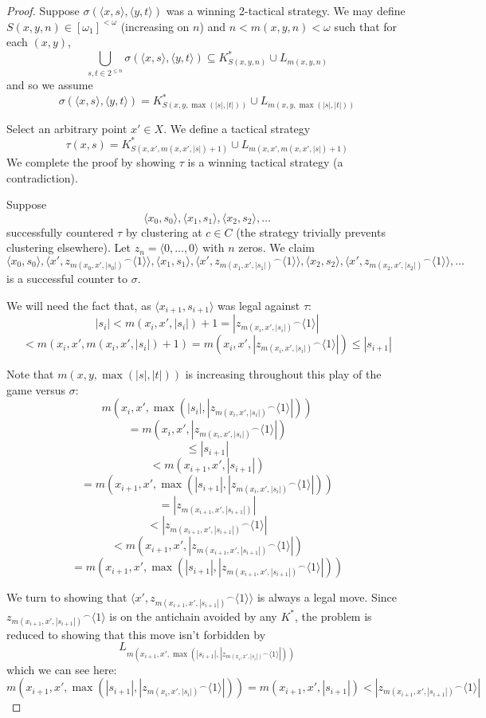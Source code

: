 \documentclass[11pt]{article}
\theoremstyle{plain}
\theoremstyle{definition}
\theoremstyle{remark}
\newcommand{\<}{\langle}
\renewcommand{\>}{\rangle}
\begin{document}
\begin{proof}
Suppose $\sigma(\<x,s\>,\<y,t\>)$ was a winning 2-tactical strategy. We may define $S(x,y,n)\in [\omega_1]^{<\omega}$ (increasing on $n$) and $n<m(x,y,n)<\omega$ such that for each $(x,y)$,
  \[
    \bigcup_{s,t \in 2^{\leq n}} \sigma(\<x,s\>,\<y,t\>) \subseteq 
    K^*_{S(x,y,n)} \cup L_{m(x,y,n)}
  \]
and so we assume
  \[
    \sigma(\<x,s\>,\<y,t\>) =
    K^*_{S(x,y,\max(|s|,|t|))} \cup L_{m(x,y,\max(|s|,|t|))}
  \]

Select an arbitrary point $x' \in X$. We define a tactical strategy 
  \[
  \tau(x,s) = 
  K^*_{S(x,x',m(x,x',|s|)+1)} \cup L_{m(x,x',m(x,x',|s|)+1)}
  \]
We complete the proof by showing $\tau$ is a winning tactical strategy (a contradiction).

Suppose
\[
\<x_0, s_0\>, \<x_1, s_1\>, \<x_2, s_2\>, \dots
\]
successfully countered $\tau$ by clustering at $c\in C$ (the strategy trivially prevents clustering elsewhere). Let $z_n = \<0,\dots,0\>$ with $n$ zeros. We claim
\[
\<x_0, s_0\>, \<x', {z_{m(x_0,x',|s_0|)}}^\frown\<1\>\>, \<x_1, s_1\>, \<x', {z_{m(x_1,x',|s_1|)}}^\frown\<1\>\>,  \<x_2, s_2\>, \<x', {z_{m(x_2,x',|s_2|)}}^\frown\<1\>\>, \dots
\]
is a successful counter to $\sigma$.

We will need the fact that, as $\<x_{i+1},s_{i+1}\>$ was legal against $\tau$:
  \[
    |s_i| <
    m(x_i,x',|s_i|)+1 =
    |{z_{m(x_i,x',|s_i|)}}^\frown\<1\>| 
  \]
  \[
    <
    m(x_i,x',m(x_i,x',|s_i|)+1) =
    m(x_i,x',|{z_{m(x_i,x',|s_i|)}}^\frown\<1\>|) \leq
    |s_{i+1}|
  \]

Note that $m(x,y,\max(|s|,|t|))$ is increasing throughout this play of the game versus $\sigma$:
  \[
    m(x_i,x',\max(|s_i|,|{z_{m(x_i,x',|s_i|)}}^\frown\<1\>|))
  \]
  \[
    =
    m(x_i,x',|{z_{m(x_i,x',|s_i|)}}^\frown\<1\>|)
  \]
  \[
    \leq
    |s_{i+1}| 
  \]
  \[
    <
    m(x_{i+1},x',|s_{i+1}|)
  \]
  \[
    =
    m(x_{i+1},x',\max(|s_{i+1}|,|{z_{m(x_i,x',|s_i|)}}^\frown\<1\>|))
  \]
  \[
    =
    |{z_{m(x_{i+1},x',|s_{i+1}|)}}|
  \]
  \[
    <
    |{z_{m(x_{i+1},x',|s_{i+1}|)}}^\frown\<1\>|
  \]
  \[
    <
    m(x_{i+1},x',|{z_{m(x_{i+1},x',|s_{i+1}|)}}^\frown\<1\>|)
  \]
  \[
    =
    m(x_{i+1},x',\max(|s_{i+1}|,|{z_{m(x_{i+1},x',|s_{i+1}|)}}^\frown\<1\>|))
  \]

We turn to showing that $\<x', {z_{m(x_{i+1},x',|s_{i+1}|)}}^\frown\<1\>\>$ is always a legal move. Since ${z_{m(x_{i+1},x',|s_{i+1}|)}}^\frown\<1\>$ is on the antichain avoided by any $K^*$, the problem is reduced to showing that this move isn't forbidden by
  \[
  L_{m(x_{i+1},x',\max(|s_{i+1}|,|{z_{m(x_i,x',|s_i|)}}^\frown\<1\>|))}
  \]
which we can see here:
  \[
    m(x_{i+1},x',\max(|s_{i+1}|,|{z_{m(x_i,x',|s_i|)}}^\frown\<1\>|)) =
    m(x_{i+1},x',|s_{i+1}|) <
    |{z_{m(x_{i+1},x',|s_{i+1}|)}}^\frown\<1\>|
  \]


\end{proof}
\end{document}
